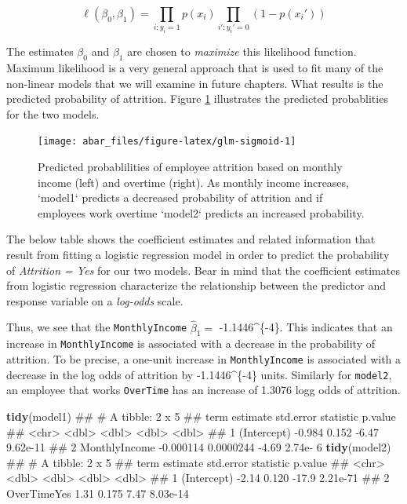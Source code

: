 \documentclass[]{book}
\newenvironment{Shaded}{\begin{snugshade}}{\end{snugshade}}
\newcommand{\KeywordTok}[1]{\textcolor[rgb]{0.13,0.29,0.53}{\textbf{#1}}}
\newcommand{\NormalTok}[1]{#1}
\theoremstyle{definition}
\theoremstyle{definition}
\theoremstyle{definition}
\theoremstyle{remark}
\begin{document}
\begin{equation}
\label{eq:max-like}
  \ell(\beta_0, \beta_1) = \prod_{i:y_i=1}p(x_i) \prod_{i':y_i'=0}(1-p(x_i'))
\end{equation}

The estimates \(\beta_0\) and \(\beta_1\) are chosen to \emph{maximize}
this likelihood function. Maximum likelihood is a very general approach
that is used to fit many of the non-linear models that we will examine
in future chapters. What results is the predicted probability of
attrition. Figure \ref{fig:glm-sigmoid} illustrates the predicted
probablities for the two models.

\begin{figure}

{\centering \texttt{[image: abar\_files/figure-latex/glm-sigmoid-1]} 

}

\caption{Predicted probablilities of employee attrition based on monthly income (left) and overtime (right). As monthly income increases, `model1` predicts a decreased probability of attrition and if employees work overtime `model2` predicts an increased probability.}\label{fig:glm-sigmoid}
\end{figure}

The below table shows the coefficient estimates and related information
that result from fitting a logistic regression model in order to predict
the probability of \emph{Attrition = Yes} for our two models. Bear in
mind that the coefficient estimates from logistic regression
characterize the relationship between the predictor and response
variable on a \emph{log-odds} scale.

Thus, we see that the \texttt{MonthlyIncome} \(\hat \beta_1 =\)
-1.1446\^{}\{-4\}. This indicates that an increase in
\texttt{MonthlyIncome} is associated with a decrease in the probability
of attrition. To be precise, a one-unit increase in
\texttt{MonthlyIncome} is associated with a decrease in the log odds of
attrition by -1.1446\^{}\{-4\} units. Similarly for
\texttt{model2}, an employee that works \texttt{OverTime} has an
increase of 1.3076 logg odds of attrition.

\begin{Shaded}
\begin{Highlighting}[]
\KeywordTok{tidy}\NormalTok{(model1)}
\NormalTok{## # A tibble: 2 x 5}
\NormalTok{##   term           estimate std.error statistic  p.value}
\NormalTok{##   <chr>             <dbl>     <dbl>     <dbl>    <dbl>}
\NormalTok{## 1 (Intercept)   -0.984    0.152         -6.47 9.62e-11}
\NormalTok{## 2 MonthlyIncome -0.000114 0.0000244     -4.69 2.74e- 6}
\KeywordTok{tidy}\NormalTok{(model2)}
\NormalTok{## # A tibble: 2 x 5}
\NormalTok{##   term        estimate std.error statistic  p.value}
\NormalTok{##   <chr>          <dbl>     <dbl>     <dbl>    <dbl>}
\NormalTok{## 1 (Intercept)    -2.14     0.120    -17.9  2.21e-71}
\NormalTok{## 2 OverTimeYes     1.31     0.175      7.47 8.03e-14}
\end{Highlighting}
\end{Shaded}
\end{document}

